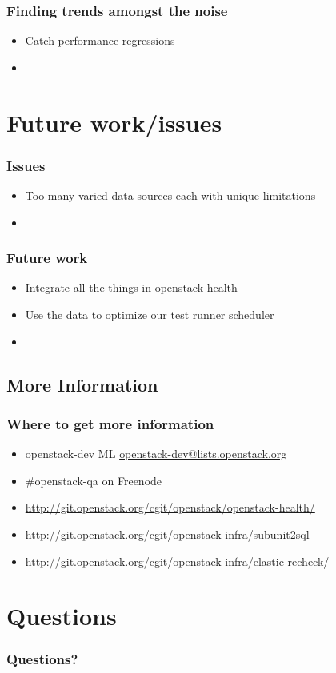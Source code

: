 \documentclass[aspectratio=169,11pt,hyperref={colorlinks=true}]{beamer}
\begin{document}
\begin{frame}
    \frametitle{Finding trends amongst the noise}
    \begin{itemize}
        \item Catch performance regressions
        \item
    \end{itemize}
\end{frame}

\section{Future work/issues}

\begin{frame}
    \frametitle{Issues}
    \begin{itemize}
        \item Too many varied data sources each with unique limitations
        \item
    \end{itemize}
\end{frame}

\begin{frame}
    \frametitle{Future work}
    \begin{itemize}
        \item Integrate all the things in openstack-health
        \item Use the data to optimize our test runner scheduler
        \item
    \end{itemize}
\end{frame}

\subsection{More Information}
\begin{frame}
\frametitle{Where to get more information}
    \begin{itemize}
        \item openstack-dev ML\: \href{mailto:openstack-dev@lists.openstack.org}{openstack-dev@lists.openstack.org}
        \item \#openstack-qa on Freenode
        \item \href{http://git.openstack.org/cgit/openstack/openstack-health/}{http://git.openstack.org/cgit/openstack/openstack-health/}
        \item \href{http://git.openstack.org/cgit/openstack-infra/subunit2sql}{http://git.openstack.org/cgit/openstack-infra/subunit2sql}
        \item \href{http://git.openstack.org/cgit/openstack-infra/elastic-recheck/}{http://git.openstack.org/cgit/openstack-infra/elastic-recheck/}
    \end{itemize}
\end{frame}

\section{Questions}
\begin{frame}
\frametitle{Questions?}
\end{frame}
\end{document}
